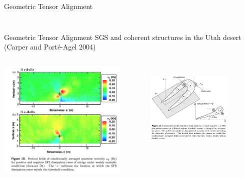 \begin{frame}{Geometric Tensor Alignment}
\begin{columns}
\begin{column}{.55\textwidth}
\begin{figure}
      \end{figure}
    \end{column}
  \end{columns}
\end{frame}

\begin{frame}{Geometric Tensor Alignment}
SGS and coherent structures in the Utah desert (Carper and Port\'{e}-Agel 2004)   
	\begin{columns}
    \begin{column}{.45\textwidth}
    \begin{minipage}[c][.1\textheight][c]{\linewidth}
    \includegraphics[width=\textwidth]{apriori23}
      \end{minipage}
    \end{column}
    \begin{column}{.55\textwidth}
    \vspace{-10pt}
      \begin{figure}
      ~\\\includegraphics[width=0.90\textwidth]{apriori25}

\end{figure}
\end{column}
\end{columns}
\end{frame}

